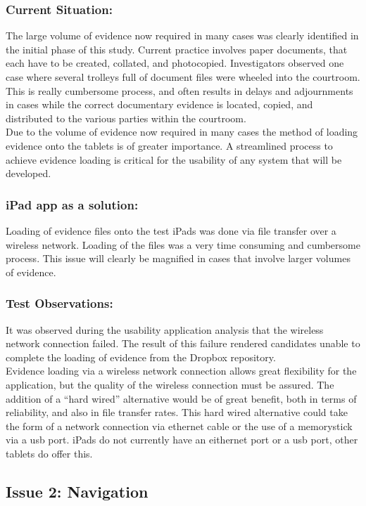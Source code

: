 \documentclass{article}
\begin{document}
 \subsubsection{Current Situation:}
The large volume of evidence now required in many cases was clearly identified in the initial phase of this study. Current practice involves paper documents, that each have to be created, collated, and photocopied. Investigators observed one case where several trolleys full of document files were wheeled into the courtroom. This is really cumbersome process, and often results in delays and adjournments in cases while the correct documentary evidence is located, copied, and distributed to the various parties within the courtroom.\\
Due to the volume of evidence now required in many cases the method of loading evidence onto the tablets is of greater importance. A streamlined process to achieve evidence loading is critical for the usability of any system that will be developed.\\
\subsubsection{iPad app as a solution:}
Loading of evidence files onto the test iPads was done via file transfer over a wireless network. Loading of the files was a very time consuming and cumbersome process. This issue will clearly be magnified in cases that involve larger volumes of evidence.\\
\subsubsection{Test Observations:}
It was observed during the usability application analysis that the wireless network connection failed. The result of this failure rendered candidates unable to complete the loading of evidence from the Dropbox repository.\\
Evidence loading via a wireless network connection allows great flexibility for the application, but the quality of the wireless connection must be assured. The addition of a ``hard wired'' alternative would be of great benefit, both in terms of reliability, and also in file transfer rates. This hard wired alternative could take the form of a network connection via ethernet cable or the use of a memorystick via a usb port. iPads do not currently have an eithernet port or a usb port, other tablets do offer this.\\
\subsection{Issue 2: Navigation}
\end{document}
